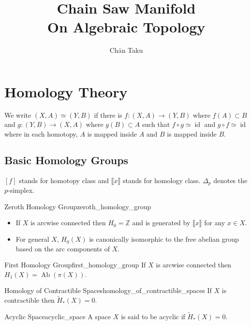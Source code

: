 \documentclass{article}
\title{Chain Saw Manifold\\
\large On Algebraic Topology}
\author{Ch\=an Taku}
\begin{document}
\maketitle

\section{Homology Theory}

We write $(X,A) \simeq (Y,B)$ if there is $f\colon (X,A) \to (Y,B)$ where $f(A)\subset B$ and $g\colon (Y,B) \to (X,A)$ where $g(B)\subset A$ such that $f\circ g \simeq \operatorname{id}$ and $g\circ f \simeq \operatorname{id}$ where in each homotopy, $A$ is mapped inside $A$ and $B$ is mapped inside $B$.

\subsection{Basic Homology Groups}

$[f]$ stands for homotopy class and $\llbracket x \rrbracket$ stands for homology class.
$\Delta_p$ denotes the $p$-simplex.

\begin{corollary}{Zeroth Homology Group}{zeroth_homology_group}
    \begin{itemize}
        \item If $X$ is arcwise connected then $H_0 = \mathbb{Z}$ and is generated by $\llbracket x \rrbracket$ for any $x\in X$.
        \item For general $X$, $H_0(X)$ is canonically isomorphic to the free abelian group based on the arc components of $X$.
    \end{itemize}
\end{corollary}

\begin{corollary}{First Homology Group}{first_homology_group}
    If $X$ is arcwise connected then $H_1(X) = \operatorname{Ab}(\pi(X))$.
\end{corollary}

\begin{corollary}{Homology of Contractible Spaces}{homology_of_contractible_spaces}
    If $X$ is contractible then $\tilde{H}_*(X) = 0$.
\end{corollary}

\begin{definition}{Acyclic Space}{acyclic_space}
    A space $X$ is said to be acyclic if $\tilde{H}_*(X) = 0$.
\end{definition}
\end{document}
